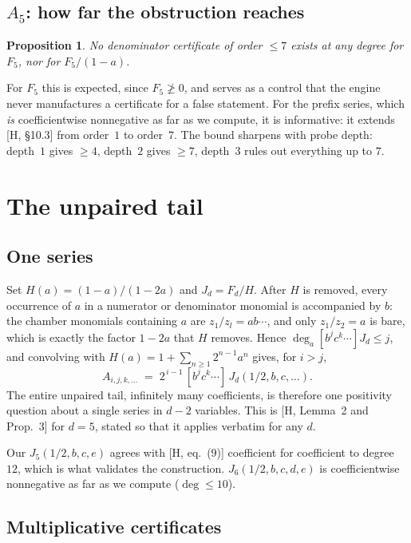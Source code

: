 \documentclass[11pt,a4paper]{article}
\theoremstyle{plain}
\newtheorem{proposition}{Proposition}
\theoremstyle{definition}
\theoremstyle{remark}
\begin{document}
\subsection{\texorpdfstring{$A_5$}{A\_5}: how far the obstruction reaches}

\begin{proposition}
No denominator certificate of order $\le 7$ exists at any degree for $F_5$, nor for
$F_5/(1-a)$.
\end{proposition}

For $F_5$ this is expected, since $F_5 \not\ge 0$, and serves as a control that the engine never
manufactures a certificate for a false statement. For the prefix series, which \emph{is}
coefficientwise nonnegative as far as we compute, it is informative: it extends [H, \S10.3] from
order~$1$ to order~$7$. The bound sharpens with probe depth: depth~$1$ gives $\ge 4$, depth~$2$
gives $\ge 7$, depth~$3$ rules out everything up to $7$.

\section{The unpaired tail}

\subsection{One series}

Set $H(a) = (1-a)/(1-2a)$ and $J_d = F_d / H$. After $H$ is removed, every occurrence of $a$ in
a numerator or denominator monomial is accompanied by $b$: the chamber monomials containing $a$
are $z_1/z_l = ab\cdots$, and only $z_1/z_2 = a$ is bare, which is exactly the factor $1 - 2a$
that $H$ removes. Hence $\deg_a [b^j c^k \cdots] J_d \le j$, and convolving with
$H(a) = 1 + \sum_{n \ge 1} 2^{n-1} a^n$ gives, for $i > j$,
\[
  A_{i,j,k,\dots} \;=\; 2^{\,i-1}\, [b^j c^k \cdots]\, J_d(1/2, b, c, \dots).
\]
The entire unpaired tail, infinitely many coefficients, is therefore one positivity question
about a single series in $d - 2$ variables. This is [H, Lemma~2 and Prop.~3] for $d = 5$, stated
so that it applies verbatim for any $d$.

Our $J_5(1/2,b,c,e)$ agrees with [H, eq.~(9)] coefficient for coefficient to degree $12$, which
is what validates the construction. $J_6(1/2,b,c,d,e)$ is coefficientwise nonnegative as far as
we compute ($\deg \le 10$).

\subsection{Multiplicative certificates}
\end{document}
